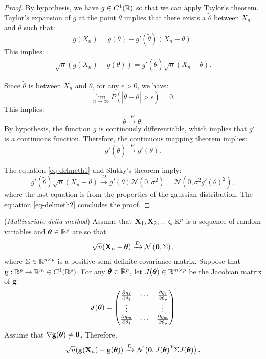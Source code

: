 \documentclass{article}
\begin{document}
\begin{proof}
By hypothesis, we have $g\in C^1(\mathbb{R})$ so that we can apply Taylor's theorem. 
Taylor's expansion of $g$ at the point $\theta$ implies that there exists a $\tilde{\theta}$ between 
$X_n$ and $\theta$ such that:
$$
g(X_n) = g(\theta) + g'\left(\tilde{\theta}\right)(X_n-\theta).
$$
This implies:
\begin{align}
\label{eq-delmeth2}
\sqrt{n} (g(X_n) - g(\theta)) = g'\left(\tilde{\theta}\right) \sqrt{n} (X_n-\theta).
\end{align}

Since $\tilde{\theta}$ is between $X_n$ and $\theta$, for any $\epsilon>0$, we have:
$$
\lim_{n\rightarrow \infty} P(|\tilde{\theta} - \theta|>\epsilon)=0.
$$
This implies:
$$
\tilde{\theta} \xrightarrow{P} \theta.
$$
By hypothesis, the function $g$ is continously differentiable, which implies that $g'$ is a 
continuous function. 
Therefore, the continuous mapping theorem implies:
$$
g'\left(\tilde{\theta}\right) \xrightarrow{P} g'(\theta).
$$

The equation \ref{eq-delmeth1} and Slutky's theorem imply:
$$
g'\left(\tilde{\theta}\right) \sqrt{n} (X_n-\theta) 
\xrightarrow{D} g'(\theta) \mathcal{N}(0,\sigma^2) = \mathcal{N}(0,\sigma^2 g'(\theta)^2),
$$
where the last equation is from the properties of the gaussian 
distribution. 
The equation \ref{eq-delmeth2} concludes the proof.
\end{proof}


\begin{theorem}
\label{theo-multivdelmeth1}
(\emph{Multivariate delta-method})
Assume that ${\bf X}_1,{\bf X}_2,... \in\mathbb{R}^p$ is a sequence of random variables 
and $\boldsymbol{\theta}\in\mathbb{R}^p$ are so that 
\begin{align}
\label{eq-multivdelmeth1}
\sqrt{n} ({\bf X}_n - \boldsymbol{\theta}) \xrightarrow{D} \mathcal{N}\left({\bf 0},\Sigma\right),
\end{align}
where $\Sigma\in\mathbb{R}^{p\times p}$ is a positive semi-definite covariance matrix. 
Suppose that ${\bf g}:\mathbb{R}^p \rightarrow \mathbb{R}^m \in C^1(\mathbb{R}^p)$. 
For any $\boldsymbol{\theta}\in\mathbb{R}^p$, let $J(\boldsymbol{\theta})\in\mathbb{R}^{m\times p}$ be the Jacobian matrix of ${\bf g}$:
$$
J(\boldsymbol{\theta}) = 
\begin{pmatrix}
\frac{\partial g_1}{\partial \theta_1} & 
\cdots &
\frac{\partial g_1}{\partial \theta_p} \\
\vdots &    & \vdots \\
\frac{\partial g_m}{\partial \theta_1} & 
\cdots &
\frac{\partial g_m}{\partial \theta_p} 
\end{pmatrix} 
$$
Assume that $\nabla {\bf g}(\boldsymbol{\theta})\neq {\bf 0}$. 
Therefore, 
$$
\sqrt{n} ({\bf g}({\bf X}_n) - {\bf g}(\boldsymbol{\theta})) \xrightarrow{D} \mathcal{N}\left({\bf 0}, J(\boldsymbol{\theta})^T \Sigma J(\boldsymbol{\theta})\right).
$$
\end{theorem}
\end{document}
